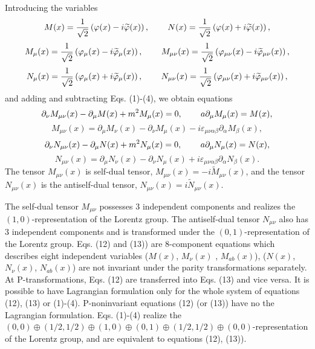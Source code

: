 \documentclass[a4paper,12pt]{article}
\begin{document}
Introducing the variables
\[
M(x)=\frac 1{\sqrt{2}}\left( \varphi (x)-i\widetilde{\varphi
}(x)\right) , \hspace{0.3in}N(x)=\frac 1{\sqrt{2}}\left(\varphi
(x)+i\widetilde{\varphi}(x)\right) ,
\]
\[
M_\mu (x)=\frac 1{\sqrt{2}}\left( \varphi_\mu
(x)-i\widetilde{\varphi}_\mu (x)\right) , \hspace{0.3in}M_{\mu \nu
}(x)=\frac 1{\sqrt{2}}\left( \varphi _{\mu \nu }(x)-i
\widetilde{\varphi}_{\mu \nu }(x)\right) ,
\]
\[
 N_\mu (x)=\frac
1{\sqrt{2}}\left( \varphi_\mu (x)+i\widetilde{\varphi}_\mu
(x)\right) , \hspace{0.3in}N_{\mu \nu }(x)=\frac 1{\sqrt{2}}\left(
\varphi _{\mu \nu }(x)+i \widetilde{\varphi }_{\mu \nu }(x)\right)
,
\]
and adding and subtracting Eqs. (1)-(4), we obtain equations
\[
\partial _\nu M_{\mu \nu }(x)-\partial _\mu M(x)+m^2M_\mu (x)=0,
\hspace{0.3in}a\partial _\mu M_\mu (x)=M(x) ,
\]
\vspace{-8mm}
\begin{equation}
\label{12}
\end{equation}
\vspace{-8mm}
\[
M_{\mu \nu }(x)=\partial _\mu M_\nu (x)-\partial _\nu M_\mu
(x)-i\varepsilon _{\mu \nu \alpha \beta }\partial _\alpha M_\beta
(x) ,
\]
\[
\partial _\nu N_{\mu \nu }(x)-\partial _\mu N(x)+m^2N_\mu (x)=0 ,
\hspace{0.3in}a\partial _\mu N_\mu (x)=N(x) ,
\]
\vspace{-8mm}
\begin{equation}
\label{13}
\end{equation}
\vspace{-8mm}
\[
N_{\mu \nu }(x)=\partial _\mu N_\nu (x)-\partial _\nu N_\mu
(x)+i\varepsilon _{\mu \nu \alpha \beta }\partial _\alpha N_\beta
(x) .
\]
The tensor $M_{\mu \nu }(x)$ is self-dual tensor, $M_{\mu \nu
}(x)=-i\widetilde{M}_{\mu \nu }(x)$, and the tensor $N_{\mu \nu
}(x)$ is the antiself-dual tensor, $N_{\mu \nu
}(x)=i\widetilde{N}_{\mu \nu }(x)$.

The self-dual tensor $M_{\mu \nu }$ possesses $3$ independent
components and realizes the $\left( 1,0\right) $-representation of
the Lorentz group. The antiself-dual tensor $N_{\mu \nu }$ also
has $3$ independent components and is transformed under the
$\left( 0,1\right) $-representation of the Lorentz group. Eqs.
(12) and (13)) are $8$-component equations which describes eight
independent variables ($M(x)$, $M_\nu (x)$ , $M_{ab}(x)$),
($N(x)$, $N_\nu (x)$, $N_{ab}(x)$) are not invariant under the
parity transformations separately. At P-transformations, Eqs. (12)
are transferred into Eqs. (13) and vice versa. It is possible to
have Lagrangian formulation only for the whole system of equations
(12), (13) or (1)-(4). P-noninvariant equations (12) (or (13))
have no the Lagrangian formulation. Eqs. (1)-(4) realize the
$(0,0)\oplus (1/2,1/2)\oplus \left( 1,0\right) \oplus \left(
0,1\right) \oplus (1/2,1/2)\oplus (0,0)$-representation of the
Lorentz group, and are equivalent to equations (12), (13)).
\end{document}
